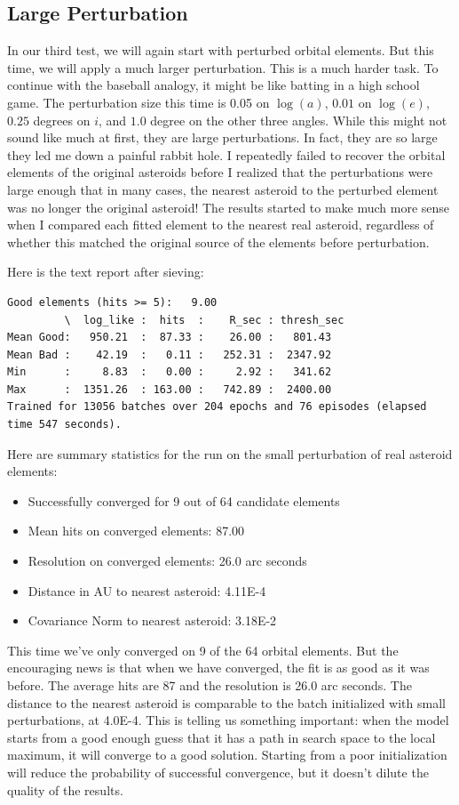 \subsection{Large Perturbation}
In our third test, we will again start with perturbed orbital elements.
But this time, we will apply a much larger perturbation.
This is a much harder task.  
To continue with the baseball analogy, it might be like batting in a high school game.
The perturbation size this time is 0.05 on $\log(a)$, $0.01$ on $\log(e)$, $0.25$ degrees on $i$, and $1.0$ degree on the other three angles.
While this might not sound like much at first, they are large perturbations.
In fact, they are so large they led me down a painful rabbit hole.
I repeatedly failed to recover the orbital elements of the original asteroids 
before I realized that the perturbations were large enough that in many cases, 
the nearest asteroid to the perturbed element was no longer the original asteroid!
The results started to make much more sense when I compared each fitted element to the nearest real asteroid,
regardless of whether this matched the original source of the elements before perturbation.

Here is the text report after sieving:
\begin{lstlisting}[style=CodeSnippet]
Good elements (hits >= 5):   9.00
         \  log_like :  hits  :    R_sec : thresh_sec
Mean Good:   950.21  :  87.33 :    26.00 :   801.43
Mean Bad :    42.19  :   0.11 :   252.31 :  2347.92
Min      :     8.83  :   0.00 :     2.92 :   341.62
Max      :  1351.26  : 163.00 :   742.89 :  2400.00
Trained for 13056 batches over 204 epochs and 76 episodes (elapsed time 547 seconds).
\end{lstlisting}

Here are summary statistics for the run on the small perturbation of real asteroid elements:
\begin{itemize}
\item Successfully converged for 9 out of 64 candidate elements
\item Mean hits on converged elements: 87.00
\item Resolution on converged elements: 26.0 arc seconds
\item Distance in AU to nearest asteroid: 4.11E-4
\item Covariance Norm to nearest asteroid: 3.18E-2
\end{itemize}
This time we've only converged on 9 of the 64 orbital elements.
But the encouraging news is that when we have converged, the fit is as good as it was before.
The average hits are 87 and the resolution is 26.0 arc seconds.
The distance to the nearest asteroid is comparable to the batch initialized with small perturbations, at 4.0E-4.
This is telling us something important: 
when the model starts from a good enough guess that it has a path in search space to the local maximum, it will converge to a good solution.
Starting from a poor initialization will reduce the probability of successful convergence, but it doesn't dilute the quality of the results.

